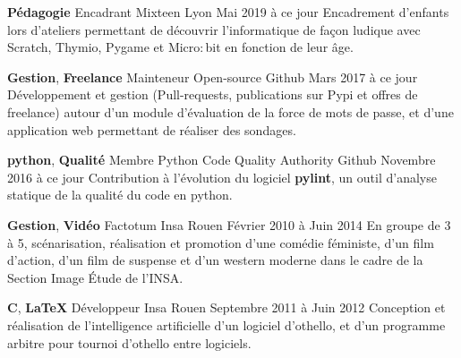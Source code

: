 \documentclass[11pt,a4paper]{moderncv}
\begin{document}
    \cventry
    {\textbf{Pédagogie}}
    {Encadrant}
    {Mixteen}
    {Lyon}
    {Mai 2019 à ce jour}{
      Encadrement d'enfants lors d'ateliers permettant de découvrir l’informatique de façon ludique avec
	  Scratch, Thymio, Pygame et Micro$:$bit en fonction de leur âge.
    }

    \cventry
    {\textbf{Gestion}, \textbf{Freelance}}
    {Mainteneur}
    {Open-source}
    {Github}
    {Mars 2017 à ce jour}{
      Développement et gestion (Pull-requests, publications sur Pypi et offres de freelance)
	  autour d'un module d'évaluation de la force de mots de passe, et d'une application web permettant de réaliser des
	  sondages.
    }

    \cventry
    {\textbf{python}, \textbf{Qualité}}
    {Membre}
    {Python Code Quality Authority}
    {Github}
    {Novembre 2016 à ce jour}{
      Contribution à l'évolution du logiciel \textbf{pylint}, un outil d'analyse statique de la qualité du code
      en python.
    }

    \cventry
    {\textbf{Gestion}, \textbf{Vidéo}}
    {Factotum}
    {Insa}
    {Rouen}
    {Février 2010 à Juin 2014}{
      En groupe de 3 à 5, scénarisation, réalisation et promotion d'une comédie
      féministe, d'un film d'action, d'un film de suspense et d'un western
      moderne dans le cadre de la Section Image Étude de l'INSA.
    }





    \cventry
    {\textbf{C}, \textbf{\LaTeX{}}}
    {Développeur}
    {Insa}
    {Rouen}
    {Septembre 2011 à Juin 2012}{
      Conception et réalisation de l'intelligence artificielle d'un logiciel
      d'othello, et d'un programme arbitre pour tournoi d'othello entre
      logiciels.
    }

\end{document}
